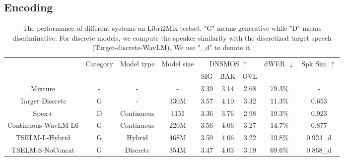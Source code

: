 \documentclass[conference]{IEEEtran}
\begin{document}
\subsection{Encoding}


\begin{table}
    \caption{The performance of different systems on Libri2Mix testset. "G" means generative while "D" means discriminative. For discrete models,
    we compute the speaker similarity with the discretized target speech 
    (Target-discrete-WavLM). We use "\_d" to denote it.  }
    \setlength{\tabcolsep}{12pt} %
    \renewcommand{\arraystretch}{1.2}
    \begin{center}
        \begin{tabular}{ccccccccc}
            \Xhline{2\arrayrulewidth} %
            \multirow{2}{*}{System} & \multirow{2}{*}{Category} & \multirow{2}{*}{Model type} & \multirow{2}{*}{Model size} & \multicolumn{3}{c}{ DNSMOS $\uparrow$} & \multirow{2}{*}{dWER $\downarrow$} & \multirow{2}{*}{Spk Sim $\uparrow$} \\
            \cline{5-7}
              &                   &                             &                             & SIG     & BAK     & OVL    &                       &                          \\ 
            \hline
            Mixture                 & - & -                           & -                           & 3.39    & 3.14    & 2.68   & 79.3\%                & -                        \\
            Target-Discrete   & G & -                          & 330M                           & 3.57    & 4.10    & 3.32   & 11.3\%                & 0.653                    \\
            \hline
            Spex+                   &  D & Continuous                  & 11M                         & 3.36    & 3.76    & 2.98   & 19.3\%                & 0.923                    \\
            \hline
            \hline
            Continuous-WavLM-L6   & G    & Continuous                  & 220M                        & 3.56    & 4.06    & 3.27   & 14.7\%                & 0.877                    \\
            TSELM-L-Hybrid    & G       & Hybrid                      & 468M                        & 3.50    & 4.06    & 3.22   & 19.8\%                & 0.924\_d                 \\
            TSELM-S-NoConcat           & G       & Discrete                    & 354M                        & 3.47    & 4.03    & 3.19   & 69.6\%                & 0.868\_d                 \\

\end{tabular}
\end{center}
\end{table}
\end{document}
